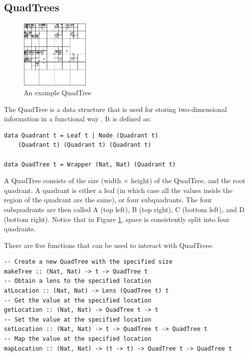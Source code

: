 \subsection{QuadTrees}
\begin{figure} %
	\vspace{-40pt}
	\includegraphics[width=0.3\textwidth]{graphics/test.png}
	\caption{An example QuadTree}
	\label{quadtree_img}
	\vspace{-90pt}
\end{figure}

The QuadTree is a data structure that is used for storing two-dimensional information in a functional way \cite{Finkel1974}. It is defined as:
\begin{verbatim}
data Quadrant t = Leaf t | Node (Quadrant t) 
	(Quadrant t) (Quadrant t) (Quadrant t)

data QuadTree t = Wrapper (Nat, Nat) (Quadrant t)
\end{verbatim}

A QuadTree consists of the size (width  ×  height) of the QuadTree, and the root quadrant. A quadrant is either a leaf (in which case all the values inside the region of the quadrant are the same), or four subquadrants. The four subquadrants are then called A (top left), B (top right), C (bottom left), and D (bottom right). Notice that in Figure \ref{quadtree_img}, space is consistently split into four quadrants.

There are five functions that can be used to interact with QuadTrees:
\begin{verbatim}
-- Create a new QuadTree with the specified size
makeTree :: (Nat, Nat) -> t -> QuadTree t
-- Obtain a lens to the specified location
atLocation :: (Nat, Nat) -> Lens (QuadTree t) t
-- Get the value at the specified location
getLocation :: (Nat, Nat) -> QuadTree t -> t
-- Set the value at the specified location
setLocation :: (Nat, Nat) -> t -> QuadTree t -> QuadTree t
-- Map the value at the specified location
mapLocation :: (Nat, Nat) -> (t -> t) -> QuadTree t -> QuadTree t
\end{verbatim}
